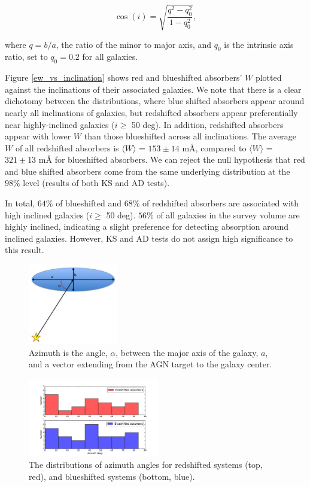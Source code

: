 \documentclass[iop]{emulateapj-rtx4}
\begin{document}
\begin{equation}
	\cos(i) = \sqrt{\frac{q^2 - q_0^2}{1 - q_0^2}},
\end{equation}

\noindent where $q = b/a$, the ratio of the minor to major axis, and $q_0$ is the intrinsic axis ratio, set to $q_0 = 0.2$ for all galaxies.

Figure \ref{ew_vs_inclination} shows red and blueshifted absorbers' $W$ plotted against the inclinations of their associated galaxies. We note that there is a clear dichotomy between the distributions, where blue shifted absorbers appear around nearly all inclinations of galaxies, but redshifted absorbers appear preferentially near highly-inclined galaxies ($i \geq$ 50 deg). In addition, redshifted absorbers appear with lower $W$ than those blueshifted across all inclinations. The average $W$ of all redshifted absorbers is $\langle W \rangle$ = $153 \pm 14$  $\textrm{m\AA}$, compared to $\langle W \rangle$ = $321 \pm 13$ $\textrm{m\AA}$ for blueshifted absorbers. We can reject the null hypothesis that red and blue shifted absorbers come from the same underlying distribution at the $98\%$ level (results of both KS and AD tests). 

In total, $64\%$ of blueshifted and $68\%$ of redshifted absorbers are associated with high inclined galaxies ($i \geq$ 50 deg). $56\%$ of all galaxies in the survey volume are highly inclined, indicating a slight preference for detecting absorption around inclined galaxies. However, KS and AD tests do not assign high significance to this result. 

\begin{figure}[h!]
        \centering
        \includegraphics[width=0.35\textwidth]{azimuth_illustration_cut.jpg}
        \caption{\small{Azimuth is the angle, $\alpha$, between the major axis of the galaxy, $a$, and a vector extending from the AGN target to the galaxy center.}}
        \label{azimuth_illustration}
\end{figure} 

\begin{figure}[h!]
        \centering
        \includegraphics[width=0.51\textwidth]{hist(azimuth)_dif.pdf}
        \caption{\small{The distributions of azimuth angles for redshifted systems (top, red), and blueshifted systems (bottom, blue).}}
        \label{azimuth_dist}
\end{figure} 
\end{document}
